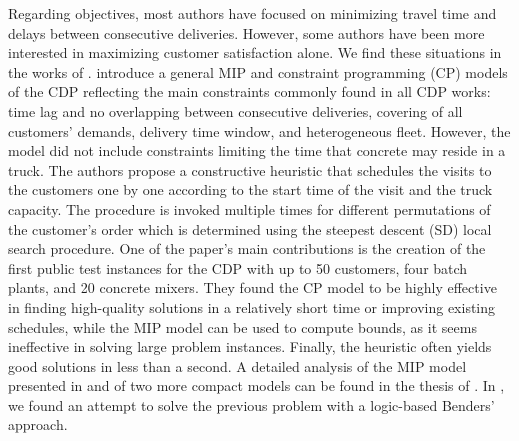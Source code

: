 Regarding objectives, most authors have focused on minimizing travel time and delays between consecutive deliveries. However, some authors have been more interested in maximizing customer satisfaction alone. We find these situations in the works of \cite{durbin2008or, kinable2014concrete, kinable2014logic, sulaman2017simulated}. \cite{kinable2014concrete} introduce a general MIP and constraint programming (CP) models of the CDP reflecting the main constraints commonly found in all CDP works: time lag and no overlapping between consecutive deliveries, covering of all customers' demands, delivery time window, and heterogeneous fleet. However, the model did not include constraints limiting the time that concrete may reside in a truck. The authors propose a constructive heuristic that schedules the visits to the customers one by one according to the start time of the visit and the truck capacity. The procedure is invoked multiple times for different permutations of the customer's order which is determined using the steepest descent (SD) local search procedure. One of the paper's main contributions is the creation of the first public test instances for the CDP with up to 50 customers, four batch plants, and 20 concrete mixers. They found the CP model to be highly effective in finding high-quality solutions in a relatively short time or improving existing schedules, while the MIP model can be used to compute bounds, as it seems ineffective in solving large problem instances. Finally, the heuristic often yields good solutions in less than a second. A detailed analysis of the MIP model presented in \cite{kinable2014concrete} and of two more compact models can be found in the thesis of \cite{hernandez_lopez_study_2020}. In \cite{kinable2014logic}, we found an attempt to solve the previous problem with a logic-based Benders' approach. %
